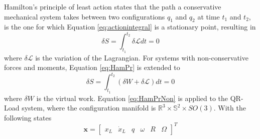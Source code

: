 Hamilton's principle of least action states that the path a conservative mechanical system takes between two configurations $ q_1 $ and $ q_2 $ at time $ t_1 $ and $ t_2 $, is the one for which Equation \ref{eq:actionintegral} is a stationary point, resulting in
\begin{equation}\label{eq:HamPr}
\delta S=\int_{t_1}^{t_2}\delta\mathcal{L}dt=0
\end{equation}
where $ \delta\mathcal{L} $ is the variation of the Lagrangian. For systems with non-conservative forces and moments, Equation \ref{eq:HamPr} is extended to
\begin{equation}\label{eq:HamPrNon}
\delta S=\int_{t_1}^{t_2}(\delta W+\delta\mathcal{L})dt=0
\end{equation}
where $ \delta W $ is the virtual work. Equation \ref{eq:HamPrNon} is applied to the QR-Load system, where the configuration manifold is $ \mathbb{R}^3\times \mathbb{S}^2\times SO(3) $. With the following states
\begin{equation}\label{eq:mod.S}
\textbf{x}= \begin{bmatrix}x_L& \dot{x}_L& q& \omega&R&\Omega
\end{bmatrix}^T
\end{equation}


